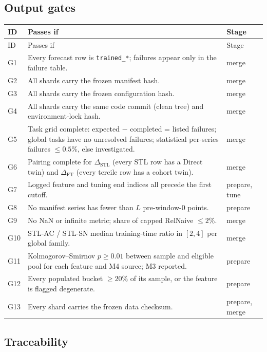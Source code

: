 \documentclass[11pt,a4paper]{article}
\newcommand{\code}[1]{\texttt{#1}}
\newcommand{\dstl}{\Delta_{\mathrm{STL}}}
\newcommand{\dft}{\Delta_{\mathrm{FT}}}
\begin{document}
\subsection{Output gates}\label{sec:gates}

{\small
\begin{longtable}{@{}p{0.7cm} p{10.4cm} p{4.0cm}@{}}
\toprule
ID & Passes if & Stage \\
\midrule
\endfirsthead
\toprule
ID & Passes if & Stage \\
\midrule
\endhead
\bottomrule
\endfoot
G1 & Every forecast row is \code{trained_*}; failures appear only in the failure table. & merge \\
G2 & All shards carry the frozen manifest hash. & merge \\
G3 & All shards carry the frozen configuration hash. & merge \\
G4 & All shards carry the same code commit (clean tree) and environment-lock hash. & merge \\
G5 & Task grid complete: expected $-$ completed = listed failures; global tasks have no unresolved failures; statistical per-series failures $\leq 0.5\%$, else investigated. & merge \\
G6 & Pairing complete for $\dstl$ (every STL row has a Direct twin) and $\dft$ (every tercile row has a cohort twin). & merge \\
G7 & Logged feature and tuning end indices all precede the first cutoff. & prepare, tune \\
G8 & No manifest series has fewer than $L$ pre-window-0 points. & prepare \\
G9 & No NaN or infinite metric; share of capped RelNaive $\leq 2\%$. & merge \\
G10 & STL-AC / STL-SN median training-time ratio in $[2, 4]$ per global family. & merge \\
G11 & Kolmogorov--Smirnov $p \geq 0.01$ between sample and eligible pool for each feature and M4 source; M3 reported. & prepare \\
G12 & Every populated bucket $\geq 20\%$ of its sample, or the feature is flagged degenerate. & prepare \\
G13 & Every shard carries the frozen data checksum. & prepare, merge \\
\end{longtable}
}

\subsection{Traceability}
\end{document}
